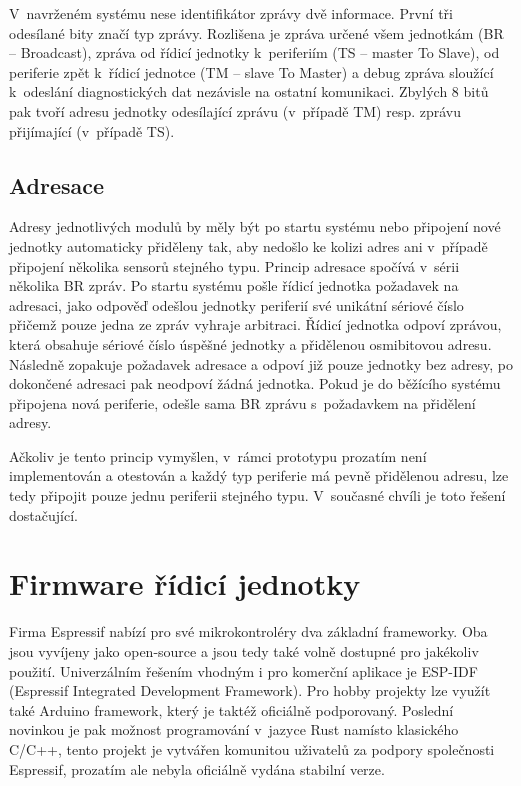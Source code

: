     V~navrženém systému nese identifikátor zprávy dvě informace. První tři odesílané bity značí typ zprávy. Rozlišena je zpráva určené všem jednotkám (BR -- Broadcast), zpráva od řídicí jednotky k~periferiím (TS -- master To Slave), od periferie zpět k~řídicí jednotce (TM -- slave To Master) a debug zpráva sloužící k~odeslání diagnostických dat nezávisle na ostatní komunikaci. Zbylých 8 bitů pak tvoří adresu jednotky odesílající zprávu (v~případě TM) resp. zprávu přijímající (v~případě TS). 
    
    \subsection{Adresace}
    Adresy jednotlivých modulů by měly být po startu systému nebo připojení nové jednotky automaticky přiděleny tak, aby nedošlo ke kolizi adres ani v~případě připojení několika sensorů stejného typu. Princip adresace spočívá v~sérii několika BR zpráv. Po startu systému pošle řídicí jednotka požadavek na adresaci, jako odpověď odešlou jednotky periferií své unikátní sériové číslo přičemž pouze jedna ze zpráv vyhraje arbitraci. Řídicí jednotka odpoví zprávou, která obsahuje sériové číslo úspěšné jednotky a přidělenou osmibitovou adresu. Následně zopakuje požadavek adresace a odpoví již pouze jednotky bez adresy, po dokončené adresaci pak neodpoví žádná jednotka. Pokud je do běžícího systému připojena nová periferie, odešle sama BR zprávu s~požadavkem na přidělení adresy.

    Ačkoliv je tento princip vymyšlen, v~rámci prototypu prozatím není implementován a otestován a každý typ periferie má pevně přidělenou adresu, lze tedy připojit pouze jednu periferii stejného typu. V~současné chvíli je toto řešení dostačující.



\section{Firmware řídicí jednotky}
    Firma Espressif nabízí pro své mikrokontroléry dva základní frameworky. Oba jsou vyvíjeny jako open-source a jsou tedy také volně dostupné pro jakékoliv použití. Univerzálním řešením vhodným i pro komerční aplikace je ESP-IDF (Espressif Integrated Development Framework). Pro hobby projekty lze využít také Arduino framework, který je taktéž oficiálně podporovaný. Poslední novinkou je pak možnost programování v~jazyce Rust namísto klasického C/C++, tento projekt je vytvářen komunitou uživatelů za podpory společnosti Espressif, prozatím ale nebyla oficiálně vydána stabilní verze. 

